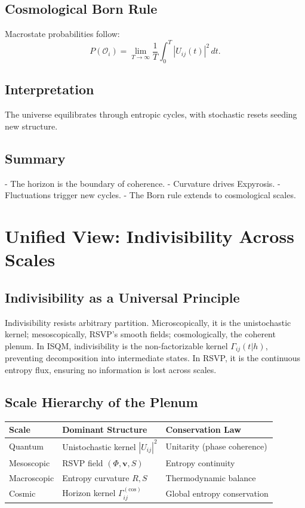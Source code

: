 \documentclass[12pt]{article}
\begin{document}
\subsection{Cosmological Born Rule}

Macrostate probabilities follow:
\[
P(\mathcal{O}_i) = \lim_{T \to \infty} \frac{1}{T} \int_0^T |U_{ij}(t)|^2 \, dt.
\]

\subsection{Interpretation}

The universe equilibrates through entropic cycles, with stochastic resets seeding new structure.

\subsection{Summary}

- The horizon is the boundary of coherence.
- Curvature drives Expyrosis.
- Fluctuations trigger new cycles.
- The Born rule extends to cosmological scales.

\section{Unified View: Indivisibility Across Scales}

\subsection{Indivisibility as a Universal Principle}

Indivisibility resists arbitrary partition. Microscopically, it is the unistochastic kernel; mesoscopically, RSVP’s smooth fields; cosmologically, the coherent plenum. In ISQM, indivisibility is the non-factorizable kernel \(\Gamma_{ij}(t | h)\), preventing decomposition into intermediate states. In RSVP, it is the continuous entropy flux, ensuring no information is lost across scales.

\subsection{Scale Hierarchy of the Plenum}

\begin{center}
\begin{tabular}{@{}lll@{}}
\toprule
\textbf{Scale} & \textbf{Dominant Structure} & \textbf{Conservation Law} \\
\midrule
Quantum & Unistochastic kernel \(|U_{ij}|^2\) & Unitarity (phase coherence) \\
Mesoscopic & RSVP field \((\Phi, \mathbf{v}, S)\) & Entropy continuity \\
Macroscopic & Entropy curvature \(R, S\) & Thermodynamic balance \\
Cosmic & Horizon kernel \(\Gamma_{ij}^{(\mathrm{cos})}\) & Global entropy conservation \\
\bottomrule
\end{tabular}
\end{center}
\end{document}
